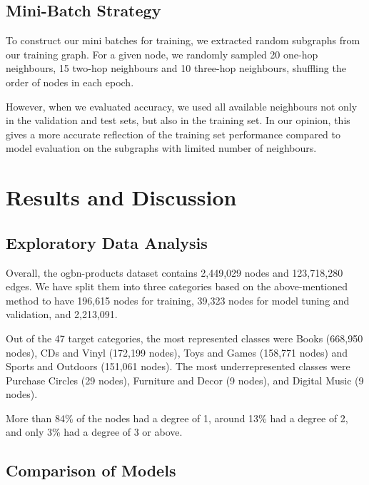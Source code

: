 \documentclass[sigconf, nonacm]{acmart}
\begin{document}
\subsection*{Mini-Batch Strategy}
To construct our mini batches for training, we extracted random subgraphs from our training graph. For a given node, we randomly sampled 20 one-hop neighbours, 15 two-hop neighbours and 10 three-hop neighbours, shuffling the order of nodes in each epoch.

However, when we evaluated accuracy, we used all available neighbours not only in the validation and test sets, but also in the training set. In our opinion, this gives a more accurate reflection of the training set performance compared to model evaluation on the subgraphs with limited number of neighbours.

\section*{Results and Discussion}

\subsection*{Exploratory Data Analysis} 
Overall, the ogbn-products dataset contains 2,449,029 nodes and 123,718,280 edges. We have split them into three categories based on the above-mentioned method to have 196,615 nodes for training, 39,323 nodes for model tuning and validation, and 2,213,091.

Out of the 47 target categories, the most represented classes were Books (668,950 nodes), CDs and Vinyl (172,199 nodes), Toys and Games (158,771 nodes) and Sports and Outdoors (151,061 nodes). The most underrepresented classes were Purchase Circles (29 nodes), Furniture and Decor (9 nodes), and Digital Music (9 nodes).

More than 84\% of the nodes had a degree of 1, around 13\% had a degree of 2, and only 3\% had a degree of 3 or above.

\subsection*{Comparison of Models}
\end{document}
